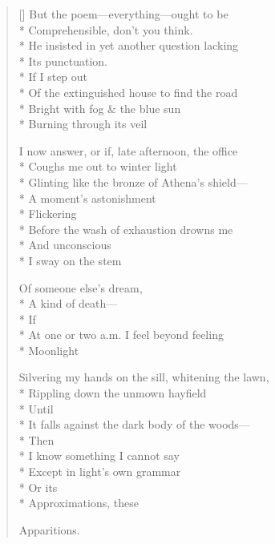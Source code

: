 \label{ch:punctuation}
\settowidth{\versewidth}{Silvering my hands on the sill, whitening the lawn,}
\begin{verse}[\versewidth]
But the poem---everything---ought to be\\*
Comprehensible, don't you think.\\*
He insisted in yet another question lacking\\*
Its punctuation.   \\*
\hspace{3\vgap} If I step out\\*
Of the extinguished house to find the road\\*
Bright with fog \& the blue sun\\*
Burning through its veil

I now answer, or if, late afternoon, the office\\*
Coughs me out to winter light\\*
Glinting like the bronze of Athena's shield---\\*
A moment's astonishment \\*
\hspace{4\vgap} Flickering\\*
Before the wash of exhaustion drowns me\\*
And unconscious \\*
I sway on the stem

Of someone else's dream,\\*
A kind of death---\\*
\hspace{3\vgap} If\\*
At one or two a.m. I feel beyond feeling\\*
Moonlight

Silvering my hands on the sill, whitening the lawn,\\*
Rippling down the unmown hayfield     \\*
\hspace{4\vgap} Until \\*
It falls against the dark body of the woods---\\*
Then\\*
\hspace{2\vgap} I know something I cannot say\\*
Except in light's own grammar\\*
\hspace{5\vgap} Or its\\*
Approximations, these

Apparitions.
\end{verse}
